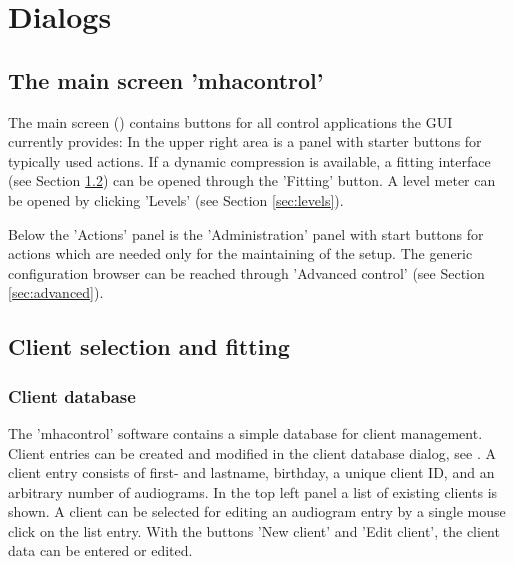 \documentclass[11pt,a4paper,twoside]{article}
\newcommand{\+}{\discretionary{\mbox{\scriptsize$\hookleftarrow$}}{}{}}
\begin{document}
\section{Dialogs}

\subsection{The main screen 'mhacontrol'}

The main screen () contains buttons for all control applications the GUI currently provides:
%
In the upper right area is a panel with starter buttons for typically
used actions.
%
If a dynamic compression is available, a fitting interface (see
Section \ref{sec:fitting}) can be opened through the 'Fitting' button.
%
A level meter can be opened by clicking 'Levels' (see Section
\ref{sec:levels}).

Below the 'Actions' panel is the 'Administration'
panel with start buttons for actions which are
needed only for the maintaining of the \mha{} setup.
%
%
The generic \mha{} configuration browser can be reached through 'Advanced
control' (see Section \ref{sec:advanced}).


\subsection{Client selection and fitting}\label{sec:fitting}

\subsubsection*{Client database}

The 'mhacontrol' software contains a simple database for client management.
%
Client entries can be created and modified in the client database
dialog, see .
%
A client entry consists of first- and lastname, birthday, a unique
client ID, and an arbitrary number of
audiograms.
%
In the top left panel a list of existing clients is shown.
%
A client can be selected for editing an audiogram entry by a single
mouse click on the list entry.
%
With the buttons 'New client' and 'Edit client', the client data can
be entered or edited.
\end{document}
